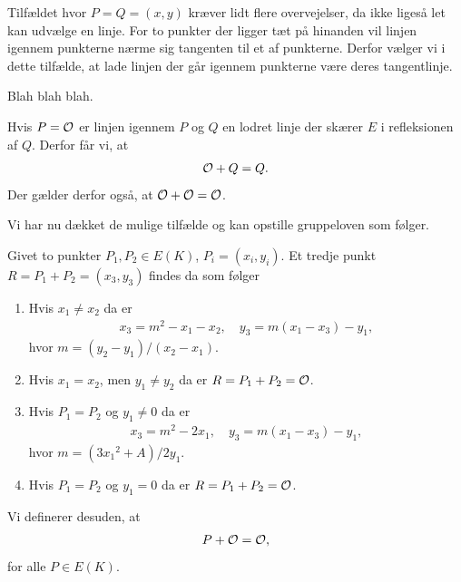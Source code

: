 Tilfældet hvor $P=Q=(x, y)$ kræver lidt flere overvejelser, da ikke ligeså
let kan udvælge en linje. For to punkter der ligger tæt på hinanden vil linjen
igennem punkterne nærme sig tangenten til et af punkterne. Derfor vælger vi i
dette tilfælde, at lade linjen der går igennem punkterne være deres tangentlinje.

Blah blah blah.

Hvis $P=\mathcal{O}$ er linjen igennem $P$ og $Q$ en lodret linje der skærer $E$ i
refleksionen af $Q$. Derfor får vi, at 
\begin{align*}
	\mathcal{O} + Q = Q.
\end{align*}
Der gælder derfor også, at $\mathcal{O} + \mathcal{O} = \mathcal{O}$.

Vi har nu dækket de mulige tilfælde og kan opstille gruppeloven som følger.

\begin{definition}
Givet to punkter $P_1, P_2 \in E(K)$, $P_i = (x_i, y_i)$. Et tredje punkt
$R = P_1 + P_2 = (x_3, y_3)$ findes da som følger
\begin{enumerate}
	\item Hvis $x_1 \neq x_2$ da er 
	\begin{align*}
		x_3 = m^2 - x_1 - x_2, \quad y_3 = m(x_1 - x_3) - y_1,
	\end{align*}		
	hvor $m = (y_2 - y_1)/(x_2 - x_1)$.
	\item Hvis $x_1 = x_2$, men $y_1 \neq y_2$ da er $R = P_1 + P_2 = \mathcal{O}$.
	\item Hvis $P_1 = P_2$ og $y_1 \neq 0$ da er 
	\begin{align*}
		x_3 = m^2 - 2x_1, \quad y_3=m(x_1 - x_3) - y_1,
	\end{align*}
	hvor $m=(3{x_1}^2 + A)/2y_1$.
	\item Hvis $P_1 = P_2$ og $y_1 = 0$ da er $R = P_1 + P_2 = \mathcal{O}$.
\end{enumerate}
Vi definerer desuden, at 
\begin{align*}
	P + \mathcal{O} = \mathcal{O},
\end{align*}
for alle $P \in E(K)$.
\end{definition}


